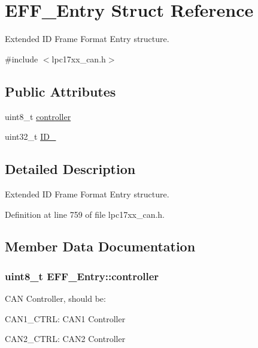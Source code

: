\hypertarget{struct_e_f_f___entry}{\section{\-E\-F\-F\-\_\-\-Entry \-Struct \-Reference}
\label{struct_e_f_f___entry}
}


\-Extended \-I\-D \-Frame \-Format \-Entry structure.  




{\ttfamily \#include $<$lpc17xx\-\_\-can.\-h$>$}

\subsection*{\-Public \-Attributes}
\begin{DoxyCompactItemize}
\item 
uint8\-\_\-t \hyperlink{struct_e_f_f___entry_acb3dbfc2ab0476c777d677c6bb5361c2}{controller}
\item 
uint32\-\_\-t \hyperlink{struct_e_f_f___entry_a83996eef6ddfa50bea2d38f628024531}{\-I\-D\-\_}
\end{DoxyCompactItemize}


\subsection{\-Detailed \-Description}
\-Extended \-I\-D \-Frame \-Format \-Entry structure. 

\-Definition at line 759 of file lpc17xx\-\_\-can.\-h.



\subsection{\-Member \-Data \-Documentation}
\hypertarget{struct_e_f_f___entry_acb3dbfc2ab0476c777d677c6bb5361c2}{
\subsubsection[{controller}]{\setlength{\rightskip}{0pt plus 5cm}uint8\-\_\-t {\bf \-E\-F\-F\-\_\-\-Entry\-::controller}}}\label{struct_e_f_f___entry_acb3dbfc2ab0476c777d677c6bb5361c2}
\-C\-A\-N \-Controller, should be\-:
\begin{DoxyItemize}
\item \-C\-A\-N1\-\_\-\-C\-T\-R\-L\-: \-C\-A\-N1 \-Controller
\item \-C\-A\-N2\-\_\-\-C\-T\-R\-L\-: \-C\-A\-N2 \-Controller 
\end{DoxyItemize}

